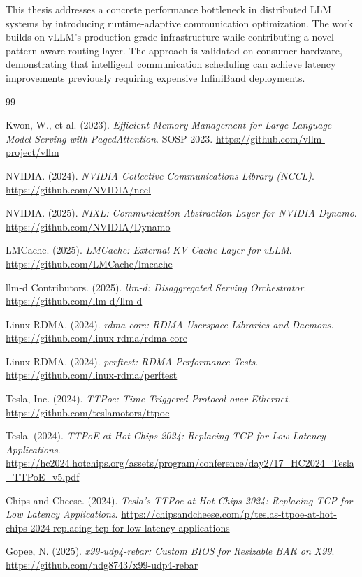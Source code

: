 \documentclass[10pt,letterpaper]{article}
\begin{document}
This thesis addresses a concrete performance bottleneck in distributed LLM systems by introducing runtime-adaptive communication optimization. The work builds on vLLM's production-grade infrastructure while contributing a novel pattern-aware routing layer. The approach is validated on consumer hardware, demonstrating that intelligent communication scheduling can achieve latency improvements previously requiring expensive InfiniBand deployments.

\begin{thebibliography}{99}

Kwon, W., et al. (2023). \textit{Efficient Memory Management for Large Language Model Serving with PagedAttention}. SOSP 2023. \url{https://github.com/vllm-project/vllm}

NVIDIA. (2024). \textit{NVIDIA Collective Communications Library (NCCL)}. \url{https://github.com/NVIDIA/nccl}

NVIDIA. (2025). \textit{NIXL: Communication Abstraction Layer for NVIDIA Dynamo}. \url{https://github.com/NVIDIA/Dynamo}

LMCache. (2025). \textit{LMCache: External KV Cache Layer for vLLM}. \url{https://github.com/LMCache/lmcache}

llm-d Contributors. (2025). \textit{llm-d: Disaggregated Serving Orchestrator}. \url{https://github.com/llm-d/llm-d}

Linux RDMA. (2024). \textit{rdma-core: RDMA Userspace Libraries and Daemons}. \url{https://github.com/linux-rdma/rdma-core}

Linux RDMA. (2024). \textit{perftest: RDMA Performance Tests}. \url{https://github.com/linux-rdma/perftest}

Tesla, Inc. (2024). \textit{TTPoe: Time-Triggered Protocol over Ethernet}. \url{https://github.com/teslamotors/ttpoe}

Tesla. (2024). \textit{TTPoE at Hot Chips 2024: Replacing TCP for Low Latency Applications}. \url{https://hc2024.hotchips.org/assets/program/conference/day2/17_HC2024_Tesla_TTPoE_v5.pdf}

Chips and Cheese. (2024). \textit{Tesla's TTPoe at Hot Chips 2024: Replacing TCP for Low Latency Applications}. \url{https://chipsandcheese.com/p/teslas-ttpoe-at-hot-chips-2024-replacing-tcp-for-low-latency-applications}

Gopee, N. (2025). \textit{x99-udp4-rebar: Custom BIOS for Resizable BAR on X99}. \url{https://github.com/ndg8743/x99-udp4-rebar}


\end{thebibliography}
\end{document}
